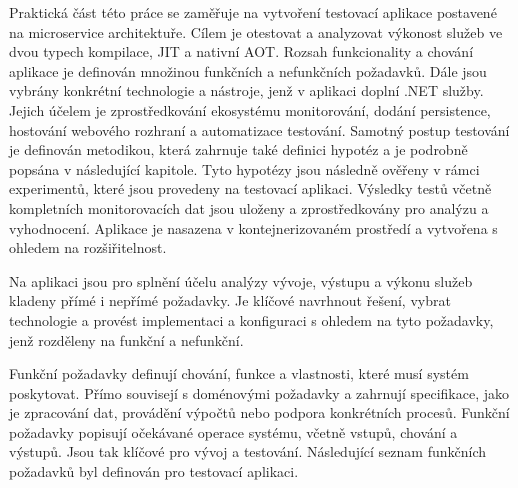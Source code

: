 

Praktická část této práce se zaměřuje na vytvoření testovací aplikace postavené na microservice architektuře. Cílem je otestovat a analyzovat výkonost služeb ve dvou typech kompilace, JIT a nativní AOT. Rozsah funkcionality a chování aplikace je definován množinou funkčních a nefunkčních požadavků. Dále jsou vybrány konkrétní technologie a nástroje, jenž v aplikaci doplní .NET služby. Jejich účelem je zprostředkování ekosystému monitorování, dodání persistence, hostování webového rozhraní a automatizace testování. Samotný postup testování je definován metodikou, která zahrnuje také definici hypotéz a je podrobně popsána v následující kapitole. Tyto hypotézy jsou následně ověřeny v rámci experimentů, které jsou provedeny na testovací aplikaci. Výsledky testů včetně kompletních monitorovacích dat jsou uloženy a zprostředkovány pro analýzu a vyhodnocení. Aplikace je nasazena v kontejnerizovaném prostředí a vytvořena s ohledem na rozšiřitelnost.


Na aplikaci jsou pro splnění účelu analýzy vývoje, výstupu a výkonu služeb kladeny přímé i nepřímé požadavky. Je klíčové navrhnout řešení, vybrat technologie a provést implementaci a konfiguraci s ohledem na tyto požadavky, jenž rozděleny na funkční a nefunkční.


Funkční požadavky definují chování, funkce a vlastnosti, které musí systém poskytovat. Přímo souvisejí s doménovými požadavky a zahrnují specifikace, jako je zpracování dat, provádění výpočtů nebo podpora konkrétních procesů. Funkční požadavky popisují očekávané operace systému, včetně vstupů, chování a výstupů. Jsou tak klíčové pro vývoj a testování. Následující seznam funkčních požadavků byl definován pro testovací aplikaci.

